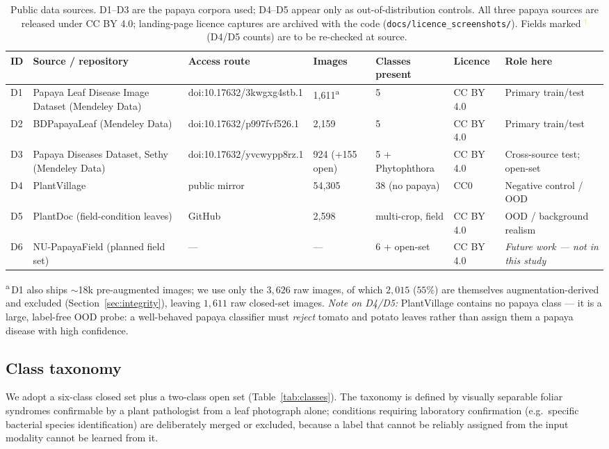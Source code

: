 \documentclass[10pt,twocolumn,a4paper]{article}
\newcommand{\VER}{\textcolor{gold}{$^{\dagger}$}}
\begin{document}
\begin{table}[t]
\centering
\caption{Public data sources. D1--D3 are the papaya corpora used; D4--D5 appear only as out-of-distribution controls. All three papaya sources are released under CC BY 4.0; landing-page licence captures are archived with the code (\texttt{docs/licence\_screenshots/}). Fields marked \VER\ (D4/D5 counts) are to be re-checked at source.}
\label{tab:datasets}
{\footnotesize
\begin{tabularx}{\textwidth}{@{}p{0.6cm} p{3.0cm} p{2.1cm} p{0.95cm} X p{1.5cm} p{1.35cm}@{}}
\toprule
\rowcolor{hdrgray}
ID & Source / repository & Access route & Images & Classes present & Licence & Role here \\
\midrule
D1 & Papaya Leaf Disease Image Dataset (Mendeley Data) & doi:10.17632/3kwgxg4stb.1 & 1{,}611\textsuperscript{a} & 5 & CC BY 4.0 & Primary train/test \\
D2 & BDPapayaLeaf \cite{bdpapaya2024} (Mendeley Data) & doi:10.17632/p997fvf526.1 & 2{,}159 & 5 & CC BY 4.0 & Primary train/test \\
D3 & Papaya Diseases Dataset, Sethy \cite{d3sethy} (Mendeley Data) & doi:10.17632/yvcwypp8rz.1 & 924 (+155 open) & 5 + Phytophthora & CC BY 4.0 & Cross-source test; open-set \\
D4 & PlantVillage \cite{mohanty2016} & public mirror & 54{,}305 & 38 (no papaya) & CC0 & Negative control / OOD \\
D5 & PlantDoc (field-condition leaves) & GitHub & 2{,}598 & multi-crop, field & CC BY 4.0 & OOD / background realism \\
D6 & NU-PapayaField (planned field set) & --- & --- & 6 + open-set & CC BY 4.0 & \emph{Future work --- not in this study} \\
\bottomrule
\end{tabularx}}
\vspace{2pt}
{\scriptsize \textsuperscript{a}\,D1 also ships $\sim$18k pre-augmented images; we use only the $3{,}626$ raw images, of which $2{,}015$ ($55\%$) are themselves augmentation-derived and excluded (Section~\ref{sec:integrity}), leaving $1{,}611$ raw closed-set images. \textit{Note on D4/D5:} PlantVillage contains no papaya class --- it is a large, label-free OOD probe: a well-behaved papaya classifier must \emph{reject} tomato and potato leaves rather than assign them a papaya disease with high confidence.}
\end{table}

\subsection{Class taxonomy}
We adopt a six-class closed set plus a two-class open set (Table~\ref{tab:classes}). The taxonomy is defined by visually separable foliar syndromes confirmable by a plant pathologist from a leaf photograph alone; conditions requiring laboratory confirmation (e.g.\ specific bacterial species identification) are deliberately merged or excluded, because a label that cannot be reliably assigned from the input modality cannot be learned from it.
\end{document}
